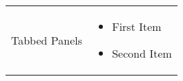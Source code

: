 \begin{longtable}{p{1.25 in} |p{4.5 in} }
Tabbed Panels &  %
\begin{itemize} \vspace{-.2 in}
\item First Item
\item Second Item
\end{itemize} \\
\end{longtable}


